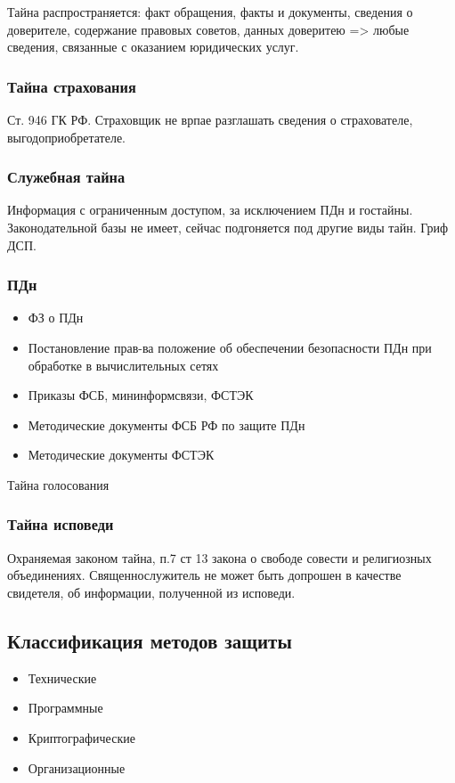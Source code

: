 \documentclass[a4paper,12pt]{report}
\begin{document}
	Тайна распространяется: факт обращения, факты и документы, сведения о доверителе, содержание правовых советов,  данных доверитею => любые сведения, связанные с оказанием юридических услуг.

	\subsubsection{Тайна страхования}
	Ст. 946 ГК РФ.
	Страховщик не врпае разглашать сведения о страхователе, выгодоприобретателе.



	\subsubsection{Служебная тайна}
	Информация с ограниченным доступом, за исключением ПДн и гостайны.
	Законодательной базы не имеет, сейчас подгоняется под другие виды тайн. Гриф ДСП.



	\subsubsection{ПДн}
	\begin{itemize}
	\item	ФЗ о ПДн
	\item	Постановление прав-ва положение об обеспечении безопасности ПДн при обработке в вычислительных сетях
	\item	Приказы ФСБ, мининформсвязи, ФСТЭК
	\item	Методические документы ФСБ РФ по защите ПДн
	\item	Методические документы ФСТЭК
	\end{itemize}

	Тайна голосования

	\subsubsection{Тайна исповеди}
	Охраняемая законом тайна, п.7 ст 13 закона о свободе совести и религиозных объединениях.
	Священнослужитель не может быть допрошен в качестве свидетеля, об информации, полученной из исповеди.

	\subsection{Классификация методов защиты}
	\begin{itemize}
	\item	Технические
	\item	Программные
	\item	Криптографические
	\item	Организационные
	\end{itemize}
\end{document}
